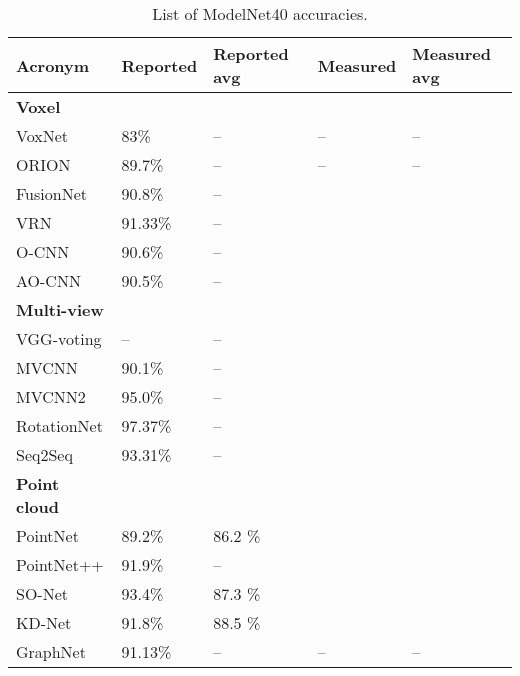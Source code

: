 \begin{table}[]
	\begin{tabular}{lllll}
		\hline
		\textbf{Acronym}       & Reported & Reported avg & Measured & Measured avg \\ \hline
		\textbf{Voxel }        &          &              &          &              \\
		VoxNet                 & 83\%     & --           & --       & --           \\
		ORION                  & 89.7\%   & --           & --       & --           \\
		FusionNet              & 90.8\%   & --           &          &              \\
		VRN                    & 91.33\%  & --           &          &              \\
		O-CNN                  & 90.6\%   & --           &          &              \\
		AO-CNN                 & 90.5\%   & --           &          &              \\
		\textbf{Multi-view }   &          &              &          &              \\
		VGG-voting             & --       & --           &          &              \\
		MVCNN                  & 90.1\%   & --           &          &              \\
		MVCNN2                 & 95.0\%   & --           &          &              \\
		RotationNet            & 97.37\%  & --           &          &              \\
		Seq2Seq                & 93.31\%  & --           &          &              \\
		\textbf{Point cloud  } &          &              &          &              \\
		PointNet               & 89.2\%   & 86.2  \%     &          &              \\
		PointNet++             & 91.9\%   & --           &          &              \\
		SO-Net                 & 93.4\%   & 87.3  \%     &          &              \\
		KD-Net                 & 91.8\%   & 88.5  \%     &          &              \\
		GraphNet               & 91.13\%  & --           & --       & --
	\end{tabular}
\caption{List of ModelNet40 accuracies.}
\label{Table:1}
\end{table}